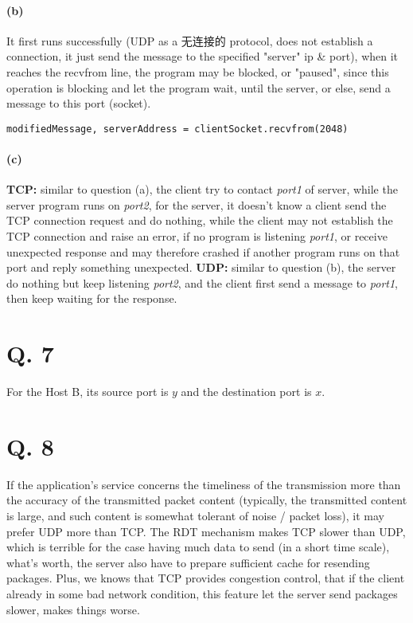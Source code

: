 \documentclass[onecolumn, oneside, ctexart]{SUSTechHomework}
\begin{document}
\paragraph{(b)}
It first runs successfully (UDP as a 无连接的 protocol, does not establish a connection, it just send the message to the specified "server" ip \& port), when it reaches the recvfrom line, the program may be blocked, or "paused", since this operation is blocking and let the program wait, until the server, or else, send a message to this port (socket).
\begin{verbatim}
modifiedMessage, serverAddress = clientSocket.recvfrom(2048)
\end{verbatim}

\paragraph{(c)}
\textbf{TCP:} similar to question (a), the client try to contact \textit{port1} of server, while the server program runs on \textit{port2}, for the server, it doesn't know a client send the TCP connection request and do nothing, while the client may not establish the TCP connection and raise an error, if no program is listening \textit{port1}, or receive unexpected response and may therefore crashed if another program runs on that port and reply something unexpected. \textbf{UDP:} similar to question (b), the server do nothing but keep listening \textit{port2}, and the client first send a message to \textit{port1}, then keep waiting for the response.

\section*{Q. 7}
For the Host B, its source port is $y$ and the destination port is $x$.

\section*{Q. 8}
If the application's service concerns the timeliness of the transmission more than the accuracy of the transmitted packet content (typically, the transmitted content is large, and such content is somewhat tolerant of noise / packet loss), it may prefer UDP more than TCP. The RDT mechanism makes TCP slower than UDP, which is terrible for the case having much data to send (in a short time scale), what's worth, the server also have to prepare sufficient cache for resending packages. Plus, we knows that TCP provides congestion control, that if the client already in some bad network condition, this feature let the server send packages slower, makes things worse.
\end{document}
